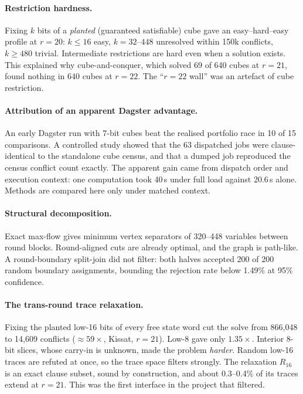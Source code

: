 \documentclass[11pt,a4paper]{article}
\begin{document}
\paragraph{Restriction hardness.} Fixing $k$ bits of a \emph{planted} (guaranteed satisfiable) cube
gave an easy--hard--easy profile at $r=20$: $k\le16$ easy, $k=32$--$448$ unresolved within 150k
conflicts, $k\ge480$ trivial. Intermediate restrictions are hard even when a solution exists. This
explained why cube-and-conquer, which solved 69 of 640 cubes at $r=21$, found nothing in 640 cubes
at $r=22$. The ``$r=22$ wall'' was an artefact of cube restriction.

\paragraph{Attribution of an apparent Dagster advantage.} An early Dagster run with 7-bit cubes beat
the realised portfolio race in 10 of 15 comparisons. A controlled study showed that the 63 dispatched
jobs were clause-identical to the standalone cube census, and that a dumped job reproduced the census
conflict count exactly. The apparent gain came from dispatch order and execution context: one
computation took 40\,s under full load against 20.6\,s alone. Methods are compared here only under
matched context.

\paragraph{Structural decomposition.} Exact max-flow gives minimum vertex separators of 320--448
variables between round blocks. Round-aligned cuts are already optimal, and the graph is path-like.
A round-boundary split-join did not filter: both halves accepted 200 of 200 random boundary
assignments, bounding the rejection rate below 1.49\% at 95\% confidence.

\paragraph{The trans-round trace relaxation.} Fixing the planted low-16 bits of every free state word
cut the solve from 866{,}048 to 14{,}609 conflicts ($\approx59\times$, Kissat, $r=21$). Low-8 gave only
$1.35\times$. Interior 8-bit slices, whose carry-in is unknown, made the problem \emph{harder}. Random
low-16 traces are refuted at once, so the trace space filters strongly. The relaxation $R_{16}$ is an
exact clause subset, sound by construction, and about 0.3--0.4\% of its traces extend at $r=21$. This
was the first interface in the project that filtered.
\end{document}
